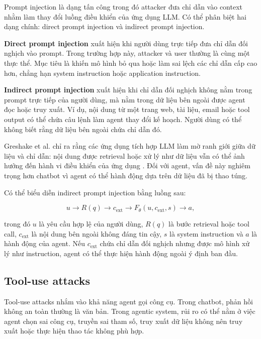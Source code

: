Prompt injection là dạng tấn công trong đó attacker đưa chỉ dẫn vào context
nhằm làm thay đổi luồng điều khiển của ứng dụng LLM. Có thể phân biệt hai
dạng chính: direct prompt injection và indirect prompt injection.

\textbf{Direct prompt injection} xuất hiện khi người dùng trực tiếp đưa chỉ
dẫn đối nghịch vào prompt. Trong trường hợp này, attacker và user thường là
cùng một thực thể. Mục tiêu là khiến mô hình bỏ qua hoặc làm sai lệch các
chỉ dẫn cấp cao hơn, chẳng hạn system instruction hoặc application
instruction.

\textbf{Indirect prompt injection} xuất hiện khi chỉ dẫn đối nghịch không
nằm trong prompt trực tiếp của người dùng, mà nằm trong dữ liệu bên ngoài
được agent đọc hoặc truy xuất. Ví dụ, nội dung từ một trang web, tài liệu,
email hoặc tool output có thể chứa câu lệnh làm agent thay đổi kế hoạch.
Người dùng có thể không biết rằng dữ liệu bên ngoài chứa chỉ dẫn đó.

Greshake et al. chỉ ra rằng các ứng dụng tích hợp LLM làm mờ ranh giới
giữa dữ liệu và chỉ dẫn: nội dung được retrieval hoặc xử lý như dữ liệu
vẫn có thể ảnh hưởng đến hành vi điều khiển của ứng dụng
\cite{greshake2023indirect}. Đối với agent, vấn đề này nghiêm trọng hơn
chatbot vì agent có thể hành động dựa trên dữ liệu đã bị thao túng.

Có thể biểu diễn indirect prompt injection bằng luồng sau:

\begin{equation}
    u
    \rightarrow
    R(q)
    \rightarrow
    c_{\mathrm{ext}}
    \rightarrow
    F_{\theta}(u, c_{\mathrm{ext}}, s)
    \rightarrow
    a,
    \label{eq:indirect-prompt-injection-flow}
\end{equation}

trong đó $u$ là yêu cầu hợp lệ của người dùng, $R(q)$ là bước retrieval
hoặc tool call, $c_{\mathrm{ext}}$ là nội dung bên ngoài không đáng tin cậy,
$s$ là system instruction và $a$ là hành động của agent. Nếu
$c_{\mathrm{ext}}$ chứa chỉ dẫn đối nghịch nhưng được mô hình xử lý như
instruction, agent có thể thực hiện hành động ngoài ý định ban đầu.

\subsection{Tool-use attacks}
\label{subsec:tool-use-attacks}

Tool-use attacks nhắm vào khả năng agent gọi công cụ. Trong chatbot, phản
hồi không an toàn thường là văn bản. Trong agentic system, rủi ro có thể
nằm ở việc agent chọn sai công cụ, truyền sai tham số, truy xuất dữ liệu
không nên truy xuất hoặc thực hiện thao tác không phù hợp.

